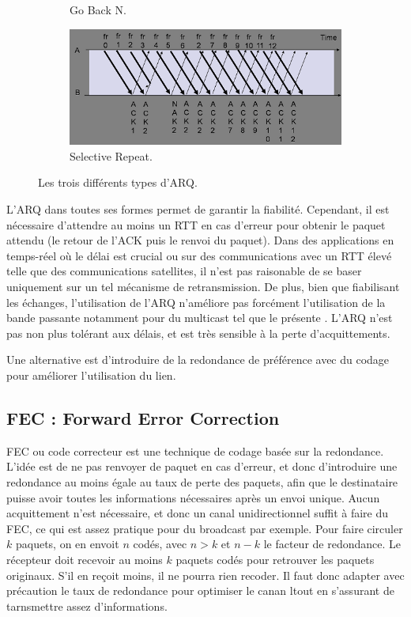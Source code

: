 \documentclass[frenchb]{article}
\begin{document}
\begin{figure}[H]
\begin{subfigure}{.5\textwidth}
  \caption{Go Back N.}
  \label{fig:sub2}
\end{subfigure}
\begin{subfigure}{\textwidth}
  \centering
  \includegraphics[scale=0.6]{img/arq3.png}
  \caption{Selective Repeat.}
  \label{fig:sub3}
\end{subfigure}
\caption{Les trois différents types d'ARQ.}
\label{fig:test}
\end{figure}

L'ARQ dans toutes ses formes permet de garantir la fiabilité. Cependant, il est nécessaire d'attendre au moins un RTT en cas d'erreur pour obtenir le paquet attendu (le retour de l'ACK puis le renvoi du paquet). Dans des applications en temps-réel où le délai est crucial ou sur des communications avec un RTT élevé telle que des communications satellites, il n'est pas raisonable de se baser uniquement sur un tel mécanisme de retransmission.
De plus, bien que fiabilisant les échanges, l'utilisation de l'ARQ n'améliore pas forcément l'utilisation de la bande passante notamment pour du multicast tel que le présente \cite{arqfornc}. L'ARQ n'est pas non plus tolérant aux délais, et est très sensible à la perte d'acquittements.

Une alternative est d'introduire de la redondance  de préférence avec du codage pour améliorer l'utilisation du lien.
 
\subsection{FEC : Forward Error Correction}
\label{FEC}
FEC ou code correcteur est une technique de codage basée sur la redondance. L'idée est de ne pas renvoyer de paquet en cas d'erreur, et donc d'introduire une redondance au moins égale au taux de perte des paquets, afin que le destinataire puisse avoir toutes les informations nécessaires après un envoi unique. Aucun acquittement n'est nécessaire, et donc un canal unidirectionnel suffit à faire du FEC, ce qui est assez pratique pour du broadcast par exemple.
Pour faire circuler $k$ paquets, on en envoit $n$ codés, avec $n>k$ et $n-k$ le facteur de redondance. Le récepteur doit recevoir au moins $k$ paquets codés pour retrouver les paquets originaux. S'il en reçoit moins, il ne pourra rien recoder. Il faut donc adapter avec précaution le taux de redondance pour optimiser le canan ltout en s'assurant de tarnsmettre assez d'informations.
\end{document}
